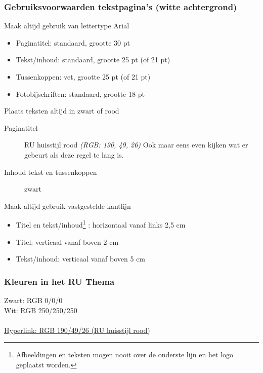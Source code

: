 \documentclass[xcolor=table,10pt,t]{beamer}
\begin{document}
\begin{frame}
    \frametitle{Gebruiksvoorwaarden tekstpagina's (witte achtergrond)}

    \begin{block}{Maak altijd gebruik van lettertype Arial}
        \begin{itemize}
            \item Paginatitel: standaard, grootte 30 pt
            \item Tekst/inhoud: standaard, grootte 25 pt (of 21 pt)
            \item Tussenkoppen: vet, grootte 25 pt (of 21 pt)
            \item Fotobijschriften: standaard, grootte 18 pt
        \end{itemize}
    \end{block}

    \begin{block}{Plaats teksten altijd in zwart of rood}
        \begin{description}
            \item[Paginatitel] RU huisstijl rood \emph{(RGB: 190, 49, 26)} Ook maar eens even kijken wat er gebeurt als deze regel te lang is.
            \item[Inhoud tekst en tussenkoppen] zwart
        \end{description}
    \end{block}

    \begin{block}{Maak altijd gebruik vastgestelde kantlijn}
        \begin{itemize}
            \item Titel en tekst/inhoud\footnote{Afbeeldingen en teksten mogen nooit over de onderste lijn en het logo geplaatst worden.}
: horizontaal vanaf links 2,5 cm
            \item Titel: verticaal vanaf boven 2 cm
            \item Tekst/inhoud: verticaal vanaf boven 5 cm
        \end{itemize}
    \end{block}

\end{frame}

\begin{frame}
    \frametitle{Kleuren in het RU Thema}

    Zwart: RGB 0/0/0 \\
    Wit: RGB 250/250/250 \\
     \\
    \href{http://google.com/}{Hyperlink: RGB 190/49/26 (RU huisstijl rood)}
\end{frame}
\end{document}
